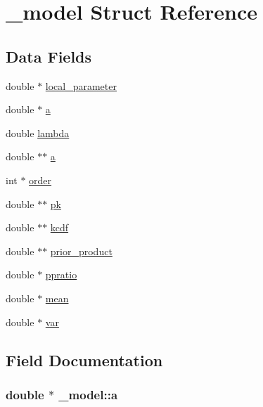 \hypertarget{struct__model}{}\section{\+\_\+model Struct Reference}
\label{struct__model}
\subsection*{Data Fields}
\begin{DoxyCompactItemize}
\item 
double $\ast$ \hyperlink{struct__model_ae8e6a88a37a15bfc1a3465e5f2cb5b12}{local\+\_\+parameter}
\item 
double $\ast$ \hyperlink{struct__model_a8cd5b330dadf46c31278c781c8f8ae84}{a}
\item 
double \hyperlink{struct__model_ad249a816f81bed8a702f24d2be8c1dfe}{lambda}
\item 
double $\ast$$\ast$ \hyperlink{struct__model_ae1b927a6a6ea553746a18852fce04874}{a}
\item 
int $\ast$ \hyperlink{struct__model_a8df0b9e6e7d2bced73cbdcab5e9bc5c1}{order}
\item 
double $\ast$$\ast$ \hyperlink{struct__model_a7d90fe9208e0f451f8068acdba5a9859}{pk}
\item 
double $\ast$$\ast$ \hyperlink{struct__model_ace71ef84e09f7e3ffe9485c60e1c8f2d}{kcdf}
\item 
double $\ast$$\ast$ \hyperlink{struct__model_aea5c339dc1034d87d6f75eb5053dc5ae}{prior\+\_\+product}
\item 
double $\ast$ \hyperlink{struct__model_aa349c474c852ef9033606816eb1dd000}{ppratio}
\item 
double $\ast$ \hyperlink{struct__model_aa3ad4728f4905d81455d065a2d249381}{mean}
\item 
double $\ast$ \hyperlink{struct__model_a5a2a2194e021abae94ecbaa09655bee8}{var}
\end{DoxyCompactItemize}


\subsection{Field Documentation}
\subsubsection[{\texorpdfstring{a}{a}}]{\setlength{\rightskip}{0pt plus 5cm}double $\ast$ \+\_\+model\+::a}\hypertarget{struct__model_a8cd5b330dadf46c31278c781c8f8ae84}{}\label{struct__model_a8cd5b330dadf46c31278c781c8f8ae84}


